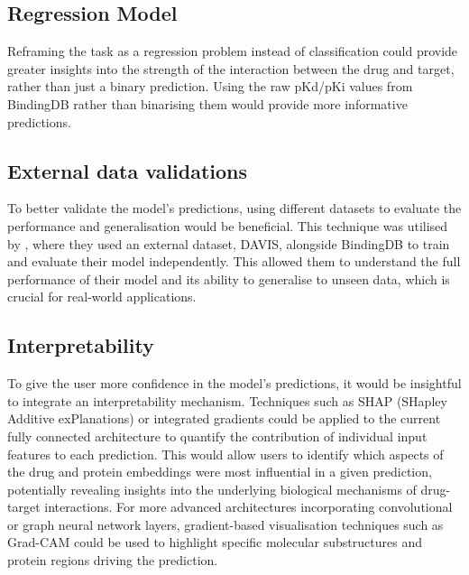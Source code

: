 \subsection{Regression Model}
Reframing the task as a regression problem instead of classification could provide greater insights into the strength of the interaction between the drug and target, rather than just a binary prediction.
Using the raw pKd/pKi values from BindingDB rather than binarising them would provide more informative predictions.
\subsection{External data validations}
To better validate the model's predictions, using different datasets to evaluate the performance and generalisation would be beneficial.
This technique was utilised by \citet{Yang2024}, where they used an external dataset, DAVIS, alongside BindingDB to train and evaluate their model independently.
This allowed them to understand the full performance of their model and its ability to generalise to unseen data, which is crucial for real-world applications.
\subsection{Interpretability}
To give the user more confidence in the model's predictions, it would be insightful to integrate an interpretability mechanism.
Techniques such as SHAP (SHapley Additive exPlanations) \citep{lundberg2017shap} or integrated gradients could be applied to the current fully connected architecture to quantify the contribution of individual input features to each prediction.
This would allow users to identify which aspects of the drug and protein embeddings were most influential in a given prediction, potentially revealing insights into the underlying biological mechanisms of drug-target interactions.
For more advanced architectures incorporating convolutional or graph neural network layers, gradient-based visualisation techniques such as Grad-CAM \citep{selvaraju2020gradcam} could be used to highlight specific molecular substructures and protein regions driving the prediction.